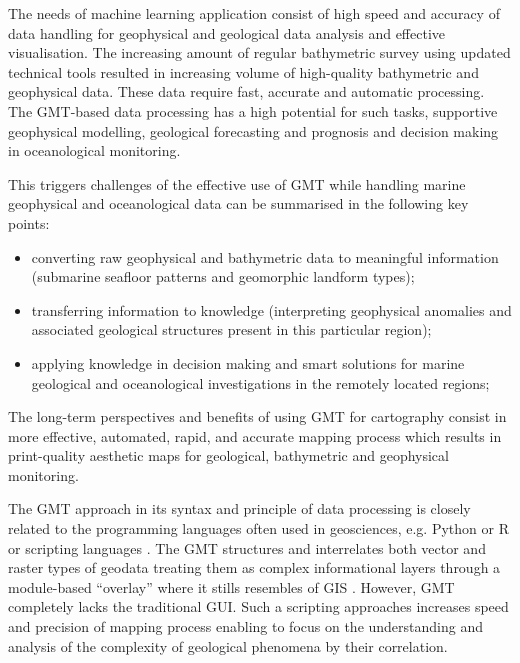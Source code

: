 \documentclass[]{interact}
\begin{document}
The needs of machine learning application consist of high speed and accuracy of data handling for geophysical and geological data analysis and effective visualisation. The increasing amount of regular bathymetric survey using updated technical tools resulted in increasing volume of high-quality bathymetric and geophysical data. These data require fast, accurate and automatic processing. The GMT-based data processing has a high potential for such tasks, supportive geophysical modelling, geological forecasting and prognosis and decision making in oceanological monitoring. 

This triggers challenges of the effective use of GMT while handling marine geophysical and oceanological data can be summarised in the following key points:
\begin{itemize}
      \item converting raw geophysical and bathymetric data to meaningful information (submarine seafloor patterns and geomorphic landform types);
      \item transferring information to knowledge (interpreting geophysical anomalies and associated geological structures present in this particular region);
      \item applying knowledge in decision making and smart solutions for marine geological and oceanological investigations in the remotely located regions;
\end{itemize}
The long-term perspectives and benefits of using GMT for cartography consist in more effective, automated, rapid, and accurate mapping process which results in print-quality aesthetic maps for geological, bathymetric and geophysical monitoring. 

The GMT approach in its syntax and principle of  data processing is closely related to the programming languages often used in geosciences, e.g. Python or R \cite{Sarkar,Lemenkova201991,Shi,Lemenkova2019e,Lemenkova201989,Dobesova2011,Lemenkova202007} or scripting languages \cite{Dobesova,Lemenkov202103}. The GMT structures and interrelates both vector and raster types of geodata treating them as complex informational layers through a module-based “overlay” where it stills resembles of GIS \cite{DeVasto,Klaucoetal2013,Klaucoetal2017,MathewNethaji,Lemenkova202125,Greenfield}. However,  GMT completely lacks the traditional GUI. Such a scripting approaches increases speed and precision of mapping process enabling to focus on the understanding and analysis of the complexity of geological phenomena by their correlation. 
   
\end{document}
